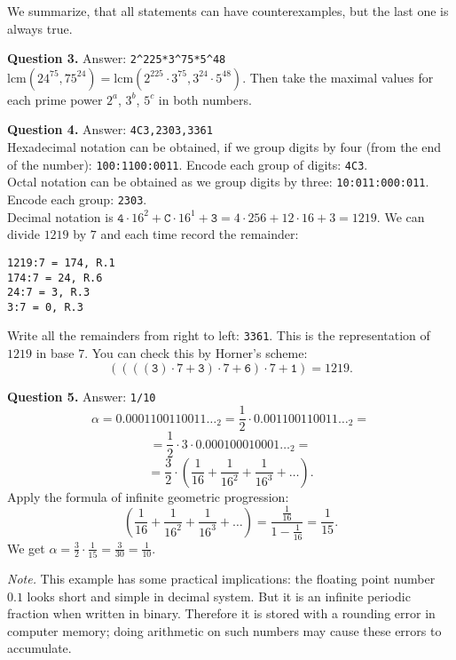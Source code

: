 \documentclass[jou]{apa6}
\begin{document}
We summarize, that all statements can have counterexamples, but the last one is always true.

\vspace{6pt}
{\bf Question 3.} Answer: {\tt 2\^{}225*3\^{}75*5\^{}48}\\
$\text{lcm}(24^{75},75^{24}) = \text{lcm}(2^{225}\cdot{}3^{75},3^{24}\cdot{}5^{48})$. Then take the maximal 
values for each prime power $2^a$, $3^b$, $5^c$ in both numbers.

\vspace{6pt} 
{\bf Question 4.} Answer: {\tt 4C3,2303,3361}\\
Hexadecimal notation can be obtained, if we group digits by four
(from the end of the number): {\tt 100:1100:0011}. Encode each group of digits: {\tt 4C3}.\\
Octal notation can be obtained as we group digits by three: 
{\tt 10:011:000:011}. Encode each group: {\tt 2303}.\\
Decimal notation is $\mathtt{4} \cdot 16^2 + \mathtt{C} \cdot 16^1 + \mathtt{3} = 
4 \cdot 256 + 12 \cdot 16 + 3 = 1219$. We can divide $1219$ by $7$ and each time record the remainder:
\begin{verbatim}
1219:7 = 174, R.1
174:7 = 24, R.6
24:7 = 3, R.3
3:7 = 0, R.3
\end{verbatim}
Write all the remainders from right to left: {\tt 3361}. This is the 
representation of $1219$ in base $7$. You can check this by Horner's scheme:
$$((((\mathtt{3}) \cdot 7 + \mathtt{3})\cdot 7 + \mathtt{6})\cdot 7 + \mathtt{1}) = 1219.$$

\vspace{6pt}
{\bf Question 5.} Answer: {\tt 1/10}\\
$$\alpha = 0.0001100110011\ldots_2 = \frac{1}{2}\cdot 0.001100110011\ldots_2 = $$
$$= \frac{1}{2} \cdot 3 \cdot 0.000100010001\ldots_2 = $$
$$= \frac{3}{2} \cdot \left( \frac{1}{16} + \frac{1}{16^2} + \frac{1}{16^3} + \ldots \right).$$
Apply the formula of infinite geometric progression:
$$\left( \frac{1}{16} + \frac{1}{16^2} + \frac{1}{16^3} + \ldots \right) = \frac{\frac{1}{16}}{1-\frac{1}{16}} = \frac{1}{15}.$$
We get $\alpha = \frac{3}{2} \cdot \frac{1}{15} = \frac{3}{30} = \frac{1}{10}$.

{\em Note.} This example has some practical implications: the floating point number $0.1$ 
looks short and simple in decimal system. But it is an infinite periodic fraction when 
written in binary. Therefore it is stored with a rounding error in 
computer memory; doing arithmetic on such numbers may cause these errors to accumulate.
\end{document}
